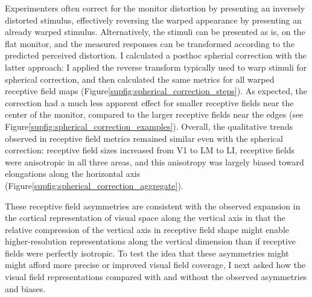 Experimenters often correct for the monitor distortion by presenting an inversely distorted stimulus, effectively reversing the warped appearance by presenting an already warped stimulus\cite{Labrigger2012}. Alternatively, the stimuli can be presented as is, on the flat monitor, and the measured responses can be transformed according to the predicted perceived distortion. I calculated a posthoc spherial correction with the latter approach:  I applied the reverse transform typically used to warp stimuli for spherical correction, and then calculated the same metrics for all warped receptive field maps (Figure\ref{supfig:spherical_correction_steps}). As expected, the correction had a much less apparent effect for smaller receptive fields near the center of the monitor, compared to the larger receptive fields near the edges (see Figure\ref{supfig:spherical_correction_examples}). Overall, the qualitative trends observed in receptive field metrics remained similar even with the spherical correction: receptive field sizes increased from V1 to LM to LI, receptive fields were anisotropic in all three areas, and this anisotropy was largely biased toward elongations along the horizontal axis (Figure\ref{supfig:spherical_correction_aggregate}).

These receptive field asymmetries are consistent with the observed expansion in the cortical representation of visual space along the vertical axis in that the relative compression of the vertical axis in receptive field shape might enable higher-resolution representations along the vertical dimension than if receptive fields were perfectly isotropic. To test the idea that these asymmetries might might afford more precise or improved visual field coverage, I next asked how the visual field representations compared with and without the observed asymmetries and biases. 

